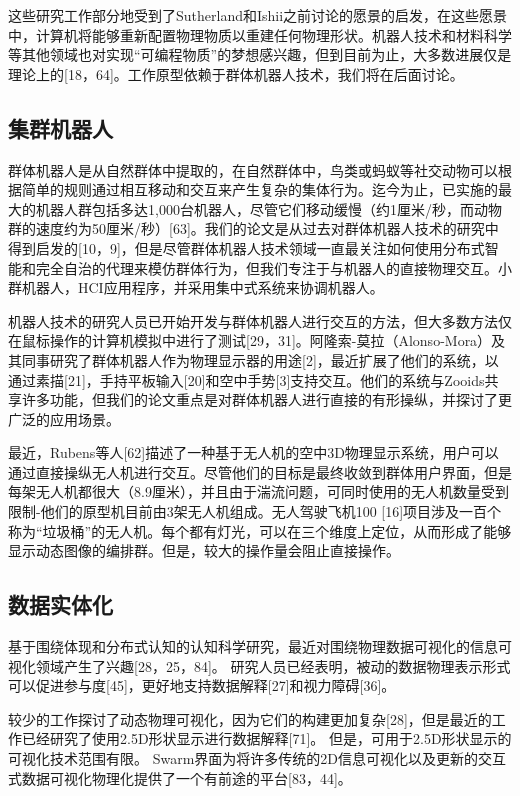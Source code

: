 这些研究工作部分地受到了Sutherland和Ishii之前讨论的愿景的启发，在这些愿景中，计算机将能够重新配置物理物质以重建任何物理形状。机器人技术和材料科学等其他领域也对实现“可编程物质”的梦想感兴趣，但到目前为止，大多数进展仅是理论上的[18，64]。工作原型依赖于群体机器人技术，我们将在后面讨论。

\subsection{集群机器人}

群体机器人是从自然群体中提取的，在自然群体中，鸟类或蚂蚁等社交动物可以根据简单的规则通过相互移动和交互来产生复杂的集体行为。迄今为止，已实施的最大的机器人群包括多达1,000台机器人，尽管它们移动缓慢（约1厘米/秒，而动物群的速度约为50厘米/秒）[63]。我们的论文是从过去对群体机器人技术的研究中得到启发的[10，9]，但是尽管群体机器人技术领域一直最关注如何使用分布式智能和完全自治的代理来模仿群体行为，但我们专注于与机器人的直接物理交互。小群机器人，HCI应用程序，并采用集中式系统来协调机器人。

机器人技术的研究人员已开始开发与群体机器人进行交互的方法，但大多数方法仅在鼠标操作的计算机模拟中进行了测试[29，31]。阿隆索-莫拉（Alonso-Mora）及其同事研究了群体机器人作为物理显示器的用途[2]，最近扩展了他们的系统，以通过素描[21]，手持平板输入[20]和空中手势[3]支持交互。他们的系统与Zooids共享许多功能，但我们的论文重点是对群体机器人进行直接的有形操纵，并探讨了更广泛的应用场景。

最近，Rubens等人[62]描述了一种基于无人机的空中3D物理显示系统，用户可以通过直接操纵无人机进行交互。尽管他们的目标是最终收敛到群体用户界面，但是每架无人机都很大（8.9厘米），并且由于湍流问题，可同时使用的无人机数量受到限制-他们的原型机目前由3架无人机组成。无人驾驶飞机100 [16]项目涉及一百个称为“垃圾桶”的无人机。每个都有灯光，可以在三个维度上定位，从而形成了能够显示动态图像的编排群。但是，较大的操作量会阻止直接操作。

\subsection{数据实体化}

基于围绕体现和分布式认知的认知科学研究，最近对围绕物理数据可视化的信息可视化领域产生了兴趣[28，25，84]。 研究人员已经表明，被动的数据物理表示形式可以促进参与度[45]，更好地支持数据解释[27]和视力障碍[36]。

较少的工作探讨了动态物理可视化，因为它们的构建更加复杂[28]，但是最近的工作已经研究了使用2.5D形状显示进行数据解释[71]。 但是，可用于2.5D形状显示的可视化技术范围有限。 Swarm界面为将许多传统的2D信息可视化以及更新的交互式数据可视化物理化提供了一个有前途的平台[83，44]。


